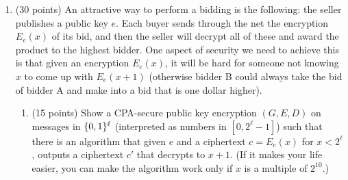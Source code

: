 \documentclass{article}
\begin{document}
\begin{enumerate}%

\item{}
(30 points) An attractive way to perform a bidding is the following: the seller publishes a public key $e$. Each buyer sends through the net the encryption $E_e(x)$ of its bid, and then the seller will
decrypt all of these and award the product to the highest bidder. One aspect of security we need to achieve this is that given an encryption $E_e(x)$, it will be hard for someone not knowing $x$ to come up with $E_e(x+1)$ (otherwise bidder B could always take the bid of bidder A and make into a bid that is one dollar higher).%

\begin{enumerate}[noitemsep,topsep=\mdcompacttopsep,label=\alph*.]%

\item{}(15 points)  Show a CPA-secure public key encryption $(G,E,D)$ on messages in $\{0,1\}^\ell$ (interpreted as numbers in $[0,2^\ell-1]$) such that there is an algorithm that given $e$ and a ciphertext $c=E_e(x)$ for $x < 2^\ell$, outputs a ciphertext $c'$ that decrypts to $x+1$. (If it makes your life easier, you can make the algorithm work only if $x$ is a multiple of $2^{10}$.)


\end{enumerate}
\end{enumerate}
\end{document}
